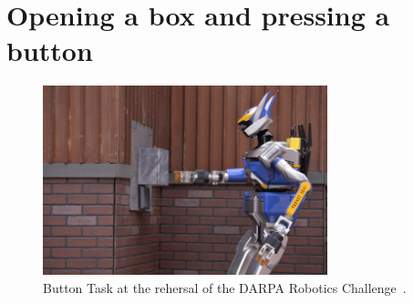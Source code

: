\section{Opening a box and pressing a button}
	\label{sub:button}
	
	\begin{figure}[t]
		\centering
		\includegraphics[height = 5.5cm]{img/button-drc}
		\caption{Button Task at the rehersal of the DARPA Robotics Challenge~\cite{DARPA}.}
		\label{fig:button-drc}
	\end{figure}